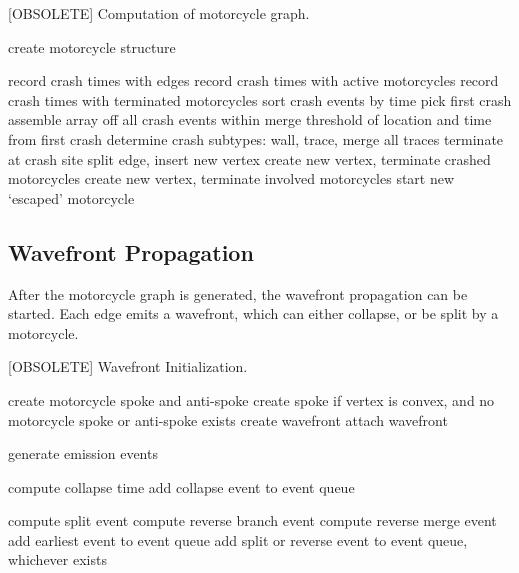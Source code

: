 \documentclass[12pt,a4paper,oneside,openany]{article}
\begin{document}
\begin{algorithm}
\caption{[OBSOLETE] Computation of motorcycle graph.}
\label{alg:mc}
\begin{algorithmic}
	\State create motorcycle structure
\EndFor

\Repeat
		\State record crash times with edges
		\State record crash times with active motorcycles
		\State record crash times with terminated motorcycles
	\EndFor
	\State sort crash events by time
	\State pick first crash
	\State assemble array off all crash events within merge threshold of location and time from first crash
	\State determine crash subtypes: wall, trace, merge
		\State all traces terminate at crash site
			\State split edge, insert new vertex
		\EndIf
		\State create new vertex, terminate crashed motorcycles
	\Else
		\State create new vertex, terminate involved motorcycles
			\State start new `escaped' motorcycle
		\EndIf
	\EndIf 

\end{algorithmic}
\end{algorithm}

\subsection{Wavefront Propagation}

After the motorcycle graph is generated, the wavefront propagation can be started. Each edge emits a wavefront, which can either collapse, or be split by a motorcycle.

\begin{algorithm}
\caption{[OBSOLETE] Wavefront Initialization.}
\label{alg:wpi}
\begin{algorithmic}
	\State create motorcycle spoke and anti-spoke
\EndFor
{}
	\State create spoke if vertex is convex, and no motorcycle spoke or anti-spoke exists
\EndFor
{}
	\State create wavefront
	\State attach wavefront
\EndFor

\State generate emission events

	\State compute collapse time
	\State add collapse event to event queue
\EndFor

		\State compute split event
	\EndIf
			\State compute reverse branch event
		\EndFor
			\State compute reverse merge event
		\EndIf
	\EndIf
		\State add earliest event to event queue
	\Else
		\State add split or reverse event to event queue, whichever exists
	\EndIf
\EndFor


\end{algorithmic}
\end{algorithm}
\end{document}
